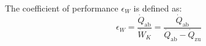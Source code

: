 The coefficient of performance \( \epsilon_W \) is defined as:  
\[
\epsilon_W = \frac{\dot{Q}_{\text{ab}}}{\dot{W}_K} = \frac{\dot{Q}_{\text{ab}}}{\dot{Q}_{\text{ab}} - \dot{Q}_{\text{zu}}}
\]